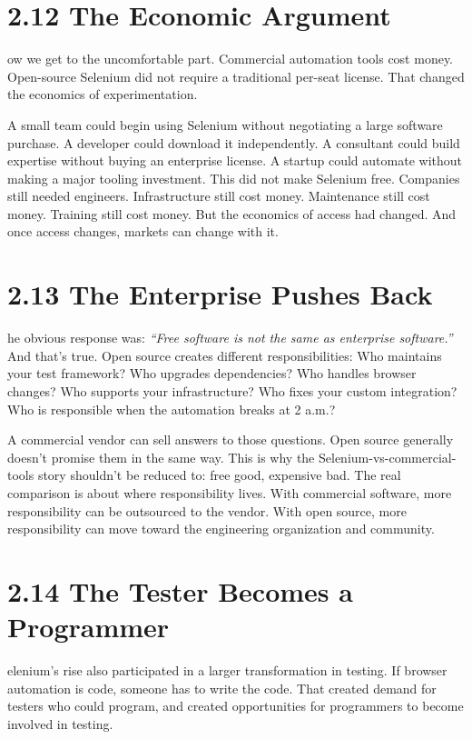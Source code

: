 \documentclass[11pt, a4paper, openany]{book}
\newcommand{\initialcap}[1]{{\fontfamily{lmss}\selectfont\huge\textbf{#1}}}
\begin{document}
\section{2.12 The Economic Argument}
\noindent \initialcap{N}ow we get to the uncomfortable part. Commercial automation tools cost money. Open-source Selenium did not require a traditional per-seat license. That changed the economics of experimentation.

A small team could begin using Selenium without negotiating a large software purchase. A developer could download it independently. A consultant could build expertise without buying an enterprise license. A startup could automate without making a major tooling investment. This did not make Selenium free. Companies still needed engineers. Infrastructure still cost money. Maintenance still cost money. Training still cost money. But the economics of access had changed. And once access changes, markets can change with it.

\section{2.13 The Enterprise Pushes Back}
\noindent \initialcap{T}he obvious response was: \textit{``Free software is not the same as enterprise software.''} And that's true. Open source creates different responsibilities: Who maintains your test framework? Who upgrades dependencies? Who handles browser changes? Who supports your infrastructure? Who fixes your custom integration? Who is responsible when the automation breaks at 2 a.m.?

A commercial vendor can sell answers to those questions. Open source generally doesn't promise them in the same way. This is why the Selenium-vs-commercial-tools story shouldn't be reduced to: free good, expensive bad. The real comparison is about where responsibility lives. With commercial software, more responsibility can be outsourced to the vendor. With open source, more responsibility can move toward the engineering organization and community.

\section{2.14 The Tester Becomes a Programmer}
\noindent \initialcap{S}elenium's rise also participated in a larger transformation in testing. If browser automation is code, someone has to write the code. That created demand for testers who could program, and created opportunities for programmers to become involved in testing.
\end{document}
